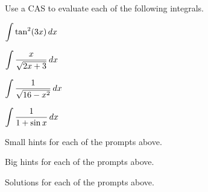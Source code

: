 \begin{activity} \label{A:5.7.2} Use a CAS to evaluate each of the following integrals.
\vspace{-.5cm}
\bmtwo
\ba
	\item $\displaystyle \int \tan^2(3x) \, dx$

	\item $\displaystyle \int \frac{x}{\sqrt{2x+3}} \, dx$
	
	\item $\displaystyle \int \frac{1}{\sqrt{16-x^2}}\, dx$
	
	\item $\displaystyle \int \frac{1}{1+\sin x} \, dx$
	
\ea
\emtwo
\end{activity}
\begin{smallhint}
\ba
	\item Small hints for each of the prompts above.
\ea
\end{smallhint}
\begin{bighint}
\ba
	\item Big hints for each of the prompts above.
\ea
\end{bighint}
\begin{activitySolution}
\ba
	\item Solutions for each of the prompts above.
\ea
\end{activitySolution}
\aftera